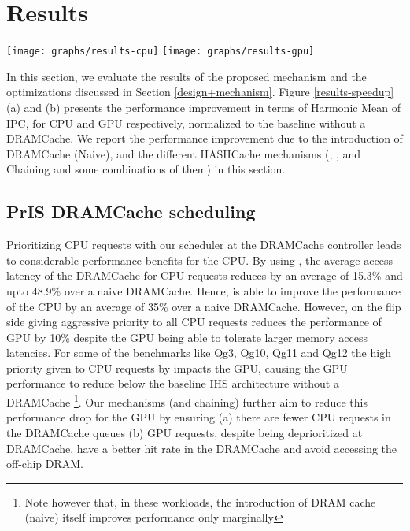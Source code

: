 \section{Results} \label{results}
\begin{figure*}[!htb]
    \centering
    \texttt{[image: graphs/results-cpu]}
    \texttt{[image: graphs/results-gpu]}
    \caption{Speedups obtained by adding a stacked DRAMCache for (a) CPU (b) GPU}
    \label{results-speedup}
\end{figure*}

In this section, we evaluate the results of the proposed \cachename mechanism and the optimizations discussed in Section \ref{design+mechanism}. Figure \ref{results-speedup} (a) and (b) presents the performance improvement in terms of Harmonic Mean of IPC, for CPU and GPU respectively, normalized to the baseline without a DRAMCache. We report the performance improvement due to the introduction of DRAMCache (Naive),  and the different HASHCache mechanisms (\prioname, \bypassname, and Chaining and some combinations of them) in this section. 

\subsection{PrIS DRAMCache scheduling}
Prioritizing CPU requests with our \prioname scheduler at the DRAMCache controller leads to considerable performance benefits for the CPU. By using \prioname, the average access latency of the DRAMCache for CPU requests reduces by an average of 15.3\% and upto 48.9\% over a naive DRAMCache. Hence, \prioname is able to improve the performance of the CPU by an average of 35\% over a naive DRAMCache. However, on the flip side giving aggressive priority to all CPU requests reduces the performance of GPU by 10\% despite the GPU being able to tolerate larger memory access latencies. For some of the benchmarks like Qg3, Qg10, Qg11 and Qg12 the high priority given to CPU requests by \prioname impacts the GPU, causing the GPU performance to reduce below the baseline IHS architecture without a DRAMCache 
\footnote{Note however that, in these workloads, the introduction of DRAM cache (naive) itself improves performance only marginally}. Our mechanisms (\bypassname and chaining) further aim to reduce this performance drop for the GPU by ensuring (a) there are fewer CPU requests in the DRAMCache queues (b) GPU requests, despite being deprioritized at DRAMCache, have a better hit rate in the DRAMCache and avoid accessing the off-chip DRAM.
